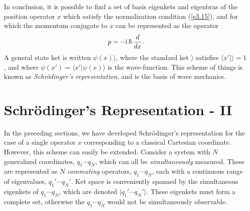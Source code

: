 In conclusion, it is possible to find a set of basis eigenkets and eigenbras
of the position operator $x$ which satisfy the normalization condition (\ref{e3.15}),
and for which the momentum conjugate to $x$ can be represented as the operator
\begin{equation}
p = -{\rm i}\,\hbar\,\frac{d}{dx}.
\end{equation}
A general state ket is written $\psi(x)\rangle$, where the standard ket $\rangle$
satisfies $\langle x'|\rangle = 1$, and where $\psi(x')= \langle x'|
\psi(x)\rangle$ is the wave-function. 
This scheme of things is known as {\em Schr\"{o}dinger's representation}, and is the
basis of wave mechanics. 

\section{Schr\"{o}dinger's Representation - II}\label{s3.5}
In the preceding sections, we have developed Schr\"{o}dinger's representation
for the case of a single 
operator $x$ corresponding to a classical Cartesian coordinate. However, this scheme
can easily be extended. Consider a system with $N$ generalized coordinates, 
$q_1\cdots q_N$, which can all be {\em simultaneously}\/ measured. These are represented 
as $N$ {\em  commuting}\/ operators, $q_1\cdots q_N$, each with a continuous range
of eigenvalues, $q_1'\cdots q_N'$.
 Ket space is conveniently spanned  by  the simultaneous
eigenkets of $q_1\cdots q_N$, which are denoted $|q_1'\cdots q_N'\rangle$. These 
eigenkets must form a complete set, otherwise the $q_1\cdots q_N$ would not be 
simultaneously observable. 

